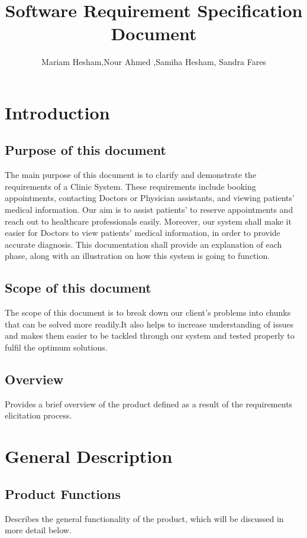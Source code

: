 \documentclass[]{article}
\title{Software Requirement Specification Document}
\author{Mariam Hesham,Nour Ahmed ,Samiha Hesham, Sandra Fares }
\begin{document}
\maketitle

\section{Introduction}

\subsection{Purpose of this document}
The main purpose of this document is to clarify and demonstrate the requirements of a Clinic System. These requirements include booking appointments, contacting Doctors or Physician assistants, and viewing patients' medical information. Our aim is to assist patients' to reserve appointments and reach out to healthcare professionals easily. Moreover, our system shall make it easier for Doctors to view patients' medical information, in order to provide accurate diagnosis. This documentation shall provide an explanation of each phase, along with an illustration on how this system is going to function. 

\subsection{ Scope of this document}
The scope of this document is to break down our client's problems into chunks that can be solved more readily.It also helps to increase understanding of issues and makes them easier to be tackled through our system and tested properly to fulfil the optimum solutions. 


\subsection{Overview}
Provides a brief overview of the product defined as a result of the requirements elicitation process. 


\section{General Description}

\subsection{Product Functions}
Describes the general functionality of the product, which will be discussed in more detail below. 
\end{document}
